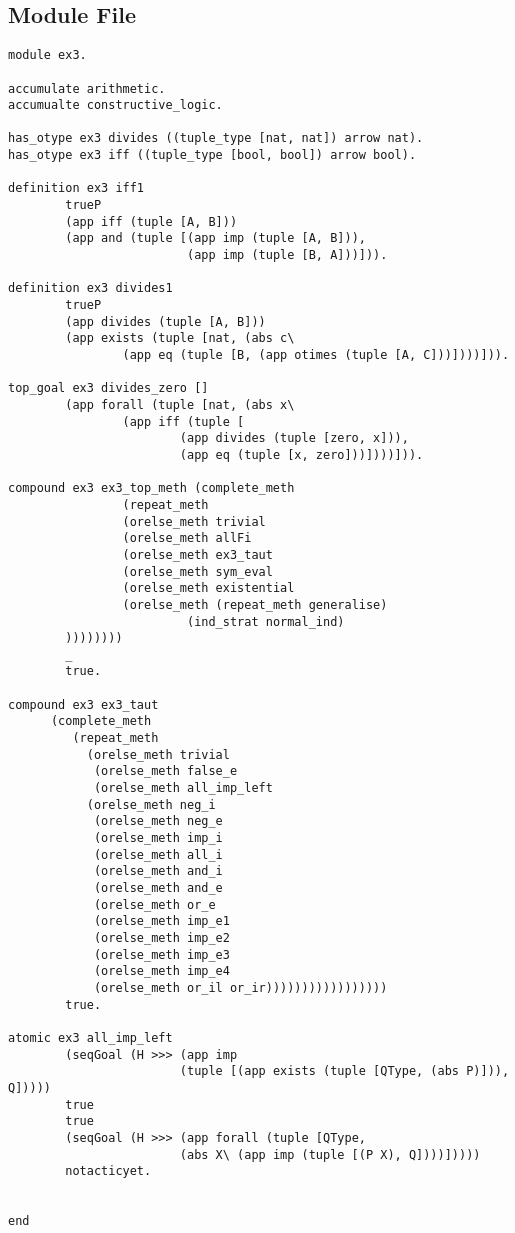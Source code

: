 \subsection{Module File}
\begin{verbatim}
module ex3.

accumulate arithmetic.
accumualte constructive_logic.

has_otype ex3 divides ((tuple_type [nat, nat]) arrow nat).
has_otype ex3 iff ((tuple_type [bool, bool]) arrow bool).

definition ex3 iff1 
        trueP
        (app iff (tuple [A, B]))
        (app and (tuple [(app imp (tuple [A, B])),
                         (app imp (tuple [B, A]))])).

definition ex3 divides1
        trueP
        (app divides (tuple [A, B]))
        (app exists (tuple [nat, (abs c\
                (app eq (tuple [B, (app otimes (tuple [A, C]))])))])).

top_goal ex3 divides_zero []
        (app forall (tuple [nat, (abs x\
                (app iff (tuple [
                        (app divides (tuple [zero, x])),
                        (app eq (tuple [x, zero]))])))])).

compound ex3 ex3_top_meth (complete_meth
                (repeat_meth
                (orelse_meth trivial
                (orelse_meth allFi
                (orelse_meth ex3_taut
                (orelse_meth sym_eval
                (orelse_meth existential
                (orelse_meth (repeat_meth generalise)
                         (ind_strat normal_ind)
        ))))))))
        _
        true.

compound ex3 ex3_taut
      (complete_meth
         (repeat_meth
           (orelse_meth trivial
            (orelse_meth false_e
            (orelse_meth all_imp_left
           (orelse_meth neg_i
            (orelse_meth neg_e
            (orelse_meth imp_i
            (orelse_meth all_i
            (orelse_meth and_i
            (orelse_meth and_e
            (orelse_meth or_e
            (orelse_meth imp_e1
            (orelse_meth imp_e2
            (orelse_meth imp_e3
            (orelse_meth imp_e4
            (orelse_meth or_il or_ir)))))))))))))))))
        true.

atomic ex3 all_imp_left
        (seqGoal (H >>> (app imp 
                        (tuple [(app exists (tuple [QType, (abs P)])), Q]))))
        true
        true
        (seqGoal (H >>> (app forall (tuple [QType,
                        (abs X\ (app imp (tuple [(P X), Q])))]))))
        notacticyet.


end
\end{verbatim}
